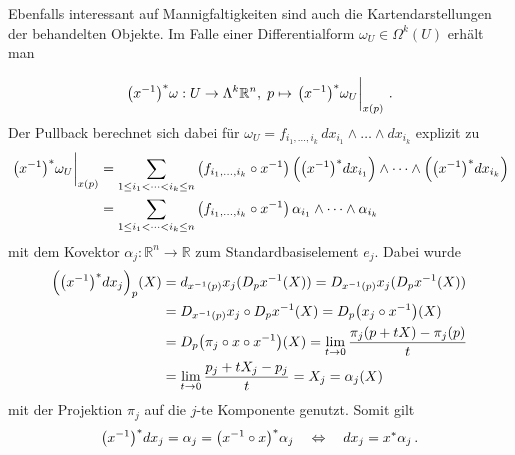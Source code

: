 \documentclass[../H_Analysis_main.tex]{subfiles}
\begin{document}

Ebenfalls interessant auf Mannigfaltigkeiten sind auch die Kartendarstellungen der behandelten Objekte. Im Falle einer Differentialform $\omega_U \in \Omega^k(U)$ erhält man

\begin{equation*}
\qty(x^{-1})^* \omega: U \rightarrow \Lambda^k \mathbb{R}^n, \; p \mapsto \eval{\qty(x^{-1})^* \omega_U}_{x(p)} \, .
\end{equation*}
Der Pullback berechnet sich dabei für $\omega_U = f_{i_1, \dots, i_k} \, dx_{i_1} \wedge \dots \wedge dx_{i_k}$ explizit zu
\begin{align}
\eval{\qty(x^{-1})^* \omega_U}_{x(p)} &= \sum_{1 \leq i_1 < \dots < i_k \leq n} \qty(f_{i_1, \dots, i_k} \circ x^{-1}) \, \qty(\qty(x^{-1})^*dx_{i_1}) \wedge \dots \wedge \qty(\qty(x^{-1})^*dx_{i_k})
\notag\\
&= \sum_{1 \leq i_1 < \dots < i_k \leq n} \qty(f_{i_1, \dots, i_k} \circ x^{-1}) \, \alpha_{i_1} \wedge \dots \wedge \alpha_{i_k}
\end{align}
mit dem Kovektor $\alpha_j: \mathbb{R}^n \rightarrow \mathbb{R}$ zum Standardbasiselement $e_j$. Dabei wurde
\begin{align}
\qty(\qty(x^{-1})^*dx_j)_p(X) &= d_{x^{-1}(p)} x_j(D_p x^{-1}(X)) = D_{x^{-1}(p)} x_j(D_p x^{-1}(X))
\notag\\
&= D_{x^{-1}(p)} x_j \circ D_p x^{-1}(X) = D_p \qty(x_j \circ x^{-1})(X) 
\notag\\
&= D_p \qty(\pi_j \circ x \circ x^{-1})(X) = \lim_{t \rightarrow 0} \frac{\pi_j(p + t X) - \pi_j(p)}{t} 
\notag\\
&= \lim_{t \rightarrow 0} \frac{p_j + t X_j - p_j}{t} = X_j = \alpha_j(X)
\end{align}
mit der Projektion $\pi_j$ auf die $j$-te Komponente genutzt. Somit gilt%
\begin{equation}
\qty(x^{-1})^* dx_j = \alpha_j = \qty(x^{-1} \circ x)^* \alpha_j \quad \Leftrightarrow \quad dx_j = x^* \alpha_j \, .
\end{equation}
\end{document}
